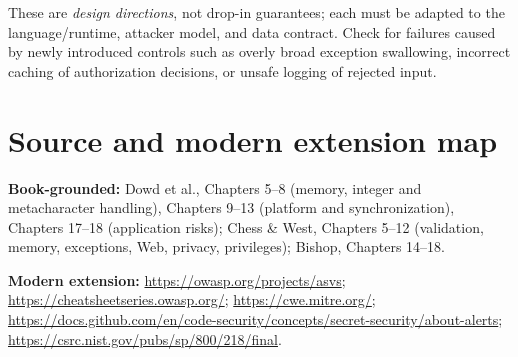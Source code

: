 \documentclass[
  letterpaper,
]{article}
\begin{document}
These are \emph{design directions}, not drop-in guarantees; each must be
adapted to the language/runtime, attacker model, and data contract.
Check for failures caused by newly introduced controls such as overly
broad exception swallowing, incorrect caching of authorization
decisions, or unsafe logging of rejected input.

\section{Source and modern extension
map}\label{source-and-modern-extension-map}

\textbf{Book-grounded:} Dowd et al., Chapters 5--8 (memory, integer and
metacharacter handling), Chapters 9--13 (platform and synchronization),
Chapters 17--18 (application risks); Chess \& West, Chapters 5--12
(validation, memory, exceptions, Web, privacy, privileges); Bishop,
Chapters 14--18.

\textbf{Modern extension:} \url{https://owasp.org/projects/asvs};
\url{https://cheatsheetseries.owasp.org/}; \url{https://cwe.mitre.org/};
\url{https://docs.github.com/en/code-security/concepts/secret-security/about-alerts};
\url{https://csrc.nist.gov/pubs/sp/800/218/final}.
\end{document}
